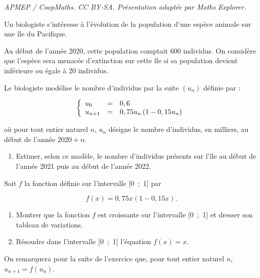 \documentclass[10pt]{article}
\begin{document}
\noindent\textit{APMEP / CoopMaths. CC BY-SA. Présentation adaptée par Maths Explorer.}\par\medskip
\medskip


Un biologiste s'intéresse à l'évolution de la population d'une espèce animale sur une île du Pacifique.

Au début de l'année 2020, cette population comptait $600$ individus. On considère que l'espèce sera menacée d'extinction sur cette île si sa population devient inférieure ou égale à 20 individus.

\smallskip

Le biologiste modélise le nombre d'individus par la suite $\left(u_n\right)$ définie par : 

\[\left\{\begin{array}{l c l}
u_0		&=	&0,6\\
u_{n+1}	&=	&0,75 u_n\left(1 - 0,15 u_n\right)
\end{array}\right.\]

où pour tout entier naturel $n$, $u_n$ désigne le nombre d'individus, en milliers, au début de l'année $2020 + n$.

\medskip

\begin{enumerate}
\item Estimer, selon ce modèle, le nombre d'individus présents sur l'île au début de l'année 2021 puis au début de l'année 2022.
\end{enumerate}

Soit $f$ la fonction définie sur l'intervalle [0~;~1] par 

\[f(x) = 0,75x (1 - 0,15x).\]

\begin{enumerate}[resume]
\item Montrer que la fonction $f$ est croissante sur l'intervalle [0~;~1] et dresser son tableau de variations.
\item Résoudre dans l'intervalle [0~;~1] l'équation $f(x) = x$.
\end{enumerate}

On remarquera pour la suite de l'exercice que, pour tout entier naturel $n$,\, $u_{n+1} = f\left(u_n\right)$.
\end{document}

